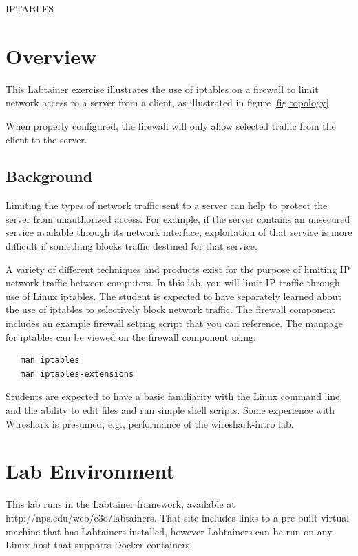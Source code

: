 


\begin{center}
{\LARGE IPTABLES}
\vspace{0.1in}\\
\end{center}


\section{Overview}
This Labtainer exercise illustrates the use of iptables
on a firewall to limit network access to a server from a client,
as illustrated in figure 
\ref{fig:topology}

When properly configured, the firewall will only allow selected
traffic from the client to the server.

\subsection {Background}
Limiting the types of network traffic sent to a server can help to
protect the server from unauthorized access.  For example, if the
server contains an unsecured service available through its network
interface, exploitation of that service is more difficult if something
blocks traffic destined for that service.

A variety of different techniques and products exist for the purpose of limiting
IP network traffic between computers.  In this lab, you will limit IP traffic through
use of Linux iptables.  
The student is expected to have separately learned about the use of iptables
to selectively block network traffic. The firewall component includes an
example firewall setting script that you can reference.  The manpage for iptables can be viewed on the
firewall component using:
\begin{verbatim}
   man iptables
   man iptables-extensions
\end{verbatim}

Students are expected to have a basic 
familiarity with the Linux command line, and the ability to edit files and
run simple shell scripts. Some experience with Wireshark is presumed, e.g., performance of
the wireshark-intro lab.

\section{Lab Environment}
This lab runs in the Labtainer framework,
available at http://nps.edu/web/c3o/labtainers.
That site includes links to a pre-built virtual machine
that has Labtainers installed, however Labtainers can
be run on any Linux host that supports Docker containers.

